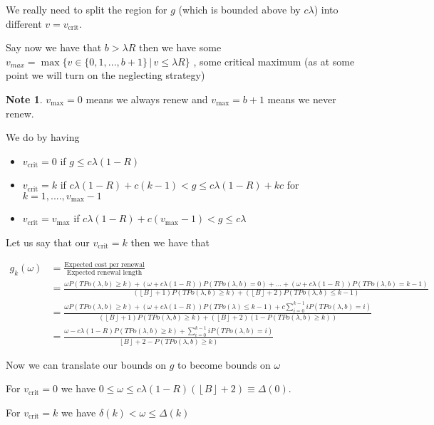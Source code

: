 \documentclass[a4paper,10pt]{article}
\newcommand{\floor}[1]{\left \lfloor #1 \right \rfloor}
\theoremstyle{definition}
\theoremstyle{definition}
\theoremstyle{remark}
\theoremstyle{definition}
\newtheorem*{note}{Note}
\begin{document}
We really need to split the region for $g$ (which is bounded above by $c \lambda$) into different $v=v_{\text{crit}}$.

Say now we have that $b > \lambda R $ then we have some $v_{max}=\max \{ v \in \{ 0,1,...,b+1 \} \, | \, v \leq \lambda R \}$ , some critical maximum (as at some point we will turn on the neglecting strategy)

\begin{note}
$v_{\text{max}}=0$ means we always renew and $v_{\text{max}}=b+1$ means we never renew.
\end{note}

We do by having
\begin{itemize}
\item $v_{\text{crit}}=0$ if $g \leq c \lambda (1-R)$
\item $v_{\text{crit}}=k$ if $c \lambda (1-R) +c(k-1) < g \leq c \lambda (1-R)+ kc$ for $k=1,....,v_{\text{max}}-1$
\item $v_{\text{crit}}=v_{\text{max}}$ if $c \lambda (1-R) + c(v_{\text{max}}-1) < g \leq c \lambda$
\end{itemize}

Let us say that our $v_{\text{crit}}=k$ then we have that

\begin{align*}
g_{k}(\omega)&=\frac{\text{Expected cost per renewal}}{\text{Expected renewal length}} \\
&= \frac{\omega P(TPo(\lambda,b) \geq k) + (\omega + c \lambda (1-R )) P(TPo(\lambda,b)=0)+...+(\omega + c \lambda (1-R)) P(TPo(\lambda,b)=k-1)}{(\floor{B}+1)P(TPo(\lambda,b) \geq k) + (\floor{B}+2)P(TPo(\lambda,b) \leq k-1)} \\
&=\frac{\omega P(TPo(\lambda,b) \geq k) + (\omega + c \lambda (1-R))P(TPo(\lambda) \leq k-1) + c \sum\limits_{i=0}^{k-1} i P(TPo(\lambda,b)=i)}{(\floor{B}+1)P(TPo(\lambda,b) \geq k) + (\floor{B}+2)(1-P(TPo(\lambda,b) \geq k))} \\
&= \frac{\omega - c \lambda (1-R) P(TPo(\lambda,b) \geq k) +  \sum\limits_{i=0}^{k-1} i P(TPo(\lambda,b)=i)}{\floor{B}+2-P(TPo(\lambda,b) \geq k)}
\end{align*}

Now we can translate our bounds on $g$ to become bounds on $\omega$

For $v_{\text{crit}}=0$ we have $0 \leq \omega \leq c \lambda (1-R)(\floor{B}+2) \equiv \Delta(0)$.

For $v_{\text{crit}}=k$ we have $\delta(k) < \omega \leq  \Delta(k)$
\end{document}

